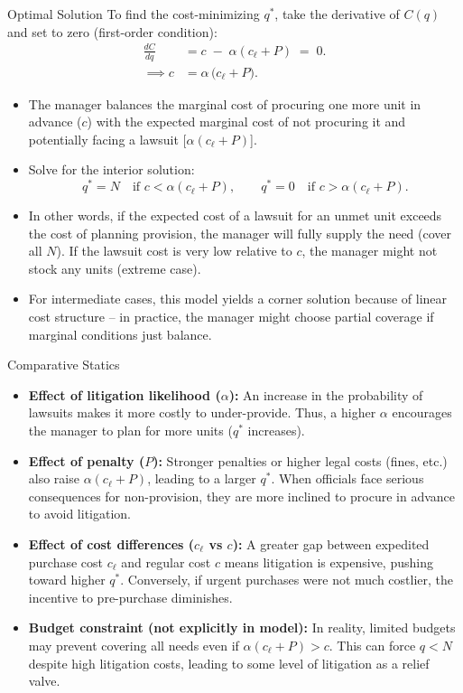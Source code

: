 \documentclass{beamer}
\begin{document}
\begin{frame}{Optimal Solution}
To find the cost-minimizing $q^*$, take the derivative of $C(q)$ and set to zero (first-order condition):
\begin{align*}
    \frac{dC}{dq} &= c \;-\; \alpha (c_{\ell} + P) \;=\; 0. \\
    \implies c &= \alpha \,\big(c_{\ell} + P\big).
\end{align*}
\begin{itemize}
  \item The manager balances the marginal cost of procuring one more unit in advance ($c$) with the expected marginal cost of not procuring it and potentially facing a lawsuit [$\alpha(c_{\ell}+P)$].
  \item Solve for the interior solution:
    \[
       q^* = N \quad \text{if } c < \alpha(c_{\ell}+P), 
       \qquad 
       q^* = 0 \quad \text{if } c > \alpha(c_{\ell}+P).
    \]
  \item In other words, if the expected cost of a lawsuit for an unmet unit exceeds the cost of planning provision, the manager will fully supply the need (cover all $N$). If the lawsuit cost is very low relative to $c$, the manager might not stock any units (extreme case).
  \item For intermediate cases, this model yields a corner solution because of linear cost structure – in practice, the manager might choose partial coverage if marginal conditions just balance.
\end{itemize}
\end{frame}

\begin{frame}{Comparative Statics}
\begin{itemize}
  \item \textbf{Effect of litigation likelihood ($\alpha$):} An increase in the probability of lawsuits makes it more costly to under-provide. Thus, a higher $\alpha$ encourages the manager to plan for more units ($q^*$ increases).
  \item \textbf{Effect of penalty ($P$):} Stronger penalties or higher legal costs (fines, etc.) also raise $\alpha(c_{\ell}+P)$, leading to a larger $q^*$. When officials face serious consequences for non-provision, they are more inclined to procure in advance to avoid litigation.
  \item \textbf{Effect of cost differences ($c_{\ell}$ vs $c$):} A greater gap between expedited purchase cost $c_{\ell}$ and regular cost $c$ means litigation is expensive, pushing toward higher $q^*$. Conversely, if urgent purchases were not much costlier, the incentive to pre-purchase diminishes.
  \item \textbf{Budget constraint (not explicitly in model):} In reality, limited budgets may prevent covering all needs even if $\alpha(c_{\ell}+P) > c$. This can force $q < N$ despite high litigation costs, leading to some level of litigation as a relief valve.
\end{itemize}
\end{frame}
\end{document}
